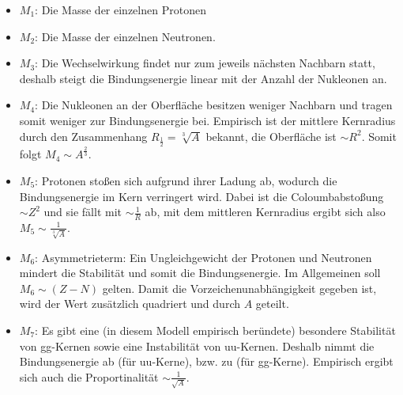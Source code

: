 \begin{itemize}
  \item $M_1$: Die Masse der einzelnen Protonen
  \item $M_2$: Die Masse der einzelnen Neutronen.
  \item $M_3$: Die Wechselwirkung findet nur zum jeweils nächsten Nachbarn statt, deshalb steigt die Bindungsenergie linear mit der Anzahl der Nukleonen an.
  \item $M_4$: Die Nukleonen an der Oberfläche besitzen weniger Nachbarn und tragen somit weniger zur Bindungsenergie bei. Empirisch ist der mittlere Kernradius durch den Zusammenhang $R_{\frac{1}{2}} = \sqrt[3]{A}$ bekannt, die Oberfläche ist $\sim R^2$. Somit folgt $M_4 \sim A^{\frac{2}{3}}$.
  \item $M_5$: Protonen stoßen sich aufgrund ihrer Ladung ab, wodurch die Bindungsenergie im Kern verringert wird. Dabei ist die Coloumbabstoßung $\sim Z^2$ und sie fällt mit $\sim \frac{1}{R}$ ab, mit dem mittleren Kernradius ergibt sich also $M_5 \sim \frac{1}{\sqrt[3]{A}}$.
  \item $M_6$: Asymmetrieterm: Ein Ungleichgewicht der Protonen und Neutronen mindert die Stabilität und somit die Bindungsenergie. Im Allgemeinen soll $M_6 \sim (Z-N)$ gelten. Damit die Vorzeichenunabhängigkeit gegeben ist, wird der Wert zusätzlich quadriert und durch $A$ geteilt.
  \item $M_7$: Es gibt eine (in diesem Modell empirisch beründete) besondere Stabilität von gg-Kernen sowie eine Instabilität von uu-Kernen. Deshalb nimmt die Bindungsenergie ab (für uu-Kerne), bzw. zu (für gg-Kerne). Empirisch ergibt sich auch die Proportinalität $\sim \frac{1}{\sqrt{A}}$.
\end{itemize}

